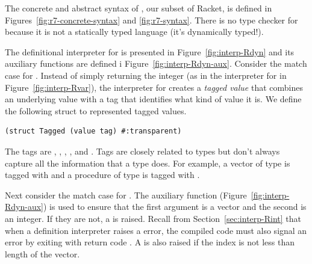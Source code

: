 \documentclass[11pt]{book}
\begin{document}
The concrete and abstract syntax of \LangDyn{}, our subset of Racket, is
defined in Figures~\ref{fig:r7-concrete-syntax} and
\ref{fig:r7-syntax}.
%
There is no type checker for \LangDyn{} because it is not a statically
typed language (it's dynamically typed!).

The definitional interpreter for \LangDyn{} is presented in
Figure~\ref{fig:interp-Rdyn} and its auxiliary functions are defined i
Figure~\ref{fig:interp-Rdyn-aux}. Consider the match case for
.  Instead of simply returning the integer  (as
in the interpreter for \LangVar{} in Figure~\ref{fig:interp-Rvar}), the
interpreter for \LangDyn{} creates a \emph{tagged value} that combines an underlying value with a tag that identifies
what kind of value it is. We define the following struct
to represented tagged values.
\begin{lstlisting}
(struct Tagged (value tag) #:transparent)
\end{lstlisting}
The tags are , , ,
, and . Tags are closely related to types
but don't always capture all the information that a type does. For
example, a vector of type  is tagged with
 and a procedure of type 
is tagged with .

Next consider the match case for .  The
 auxiliary function (Figure~\ref{fig:interp-Rdyn-aux})
is used to ensure that the first argument is a vector and the second
is an integer. If they are not, a  is raised.
Recall from Section~\ref{sec:interp-Rint} that when a definition
interpreter raises a  error, the compiled code
must also signal an error by exiting with return code .  A
 is also raised if the index is not less than
length of the vector.
\end{document}

